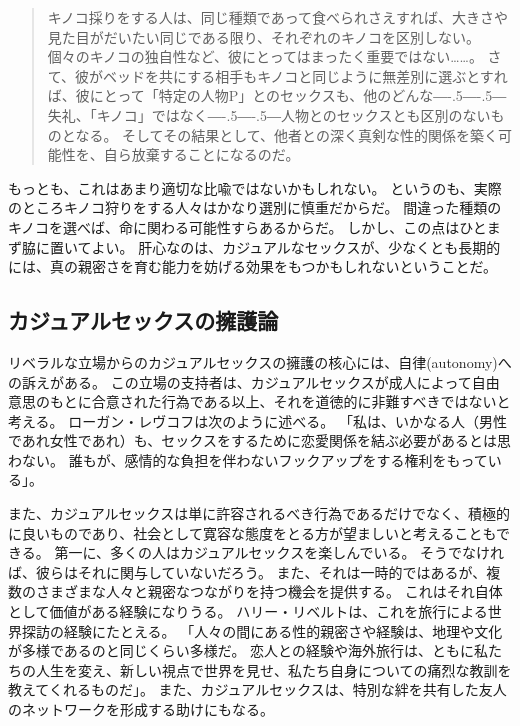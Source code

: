 \documentclass[paper=a4,book,openany]{jlreq}
\def\DDASH{―\kern-.5\zw―\kern-.5\zw―} %
\begin{document}
\begin{quote}
  キノコ採りをする人は、同じ種類であって食べられさえすれば、大きさや見た目がだいたい同じである限り、それぞれのキノコを区別しない。
個々のキノコの独自性など、彼にとってはまったく重要ではない……。
さて、彼がベッドを共にする相手もキノコと同じように無差別に選ぶとすれば、彼にとって「特定の人物P」とのセックスも、他のどんな{\DDASH}失礼、「キノコ」ではなく{\DDASH}人物とのセックスとも区別のないものとなる。
そしてその結果として、他者との深く真剣な性的関係を築く可能性を、自ら放棄することになるのだ。
\citep[p. 101]{krisjansson98:_casual_sex_revis}
\end{quote}

もっとも、これはあまり適切な比喩ではないかもしれない。
というのも、実際のところキノコ狩りをする人々はかなり選別に慎重だからだ。
間違った種類のキノコを選べば、命に関わる可能性すらあるからだ。
しかし、この点はひとまず脇に置いてよい。
肝心なのは、カジュアルなセックスが、少なくとも長期的には、真の親密さを育む能力を妨げる効果をもつかもしれないということだ。

\subsection{カジュアルセックスの擁護論}

リベラルな立場からのカジュアルセックスの擁護の核心には、自律(autonomy)への訴えがある。
この立場の支持者は、カジュアルセックスが成人によって自由意思のもとに合意された行為である以上、それを道徳的に非難すべきではないと考える。
ローガン・レヴコフは次のように述べる。
「私は、いかなる人（男性であれ女性であれ）も、セックスをするために恋愛関係を結ぶ必要があるとは思わない。
誰もが、感情的な負担を伴わないフックアップをする権利をもっている」\citep{levkoff13:_penn_grad_resp}。

また、カジュアルセックスは単に許容されるべき行為であるだけでなく、積極的に良いものであり、社会として寛容な態度をとる方が望ましいと考えることもできる。
第一に、多くの人はカジュアルセックスを楽しんでいる。
そうでなければ、彼らはそれに関与していないだろう。
また、それは一時的ではあるが、複数のさまざまな人々と親密なつながりを持つ機会を提供する。
これはそれ自体として価値がある経験になりうる。
ハリー・リベルトは、これを旅行による世界探訪の経験にたとえる。
「人々の間にある性的親密さや経験は、地理や文化が多様であるのと同じくらい多様だ。
恋人との経験や海外旅行は、ともに私たちの人生を変え、新しい視点で世界を見せ、私たち自身についての痛烈な教訓を教えてくれるものだ」\citep[p. 414]{liberto17:_prob_sexual_prom}。
また、カジュアルセックスは、特別な絆を共有した友人のネットワークを形成する助けにもなる。
\end{document}
